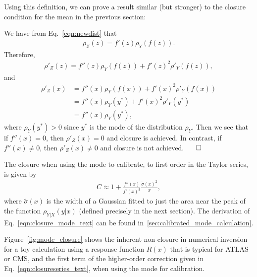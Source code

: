 \noindent Using this definition, we can prove a result similar (but stronger) to the closure condition for the mean in the previous section:

\vspace{5mm}


\vspace{5mm}

 We have from Eq.~\ref{eqn:newdist} that
\begin{align}
\rho_Z(z) = f'(z)\rho_Y(f(z)).
\end{align}
Therefore,
\begin{align}
\rho'_Z(z) = f''(z)\rho_Y(f(z))+f'(z)^2\rho'_Y(f(z)),
\end{align}
and
\begin{align}
\rho'_Z(x) &= f''(x)\rho_Y(f(x))+f'(x)^2\rho'_Y(f(x))\nonumber\\
&=f''(x)\rho_Y(y^*)+f'(x)^2\rho'_Y(y^*)\nonumber\\
&=f''(x)\rho_Y(y^*),
\end{align}
where $\rho_Y(y^*)>0$ since $y^*$ is the mode of the distribution $\rho_Y$. Then we see that if $f''(x)=0$, then $\rho'_Z(x)=0$ and closure is achieved.  In contrast, if $f''(x)\ne 0$, then $\rho'_Z(x)\ne 0$ and closure is not achieved. $\hspace{0.5 cm}\Box$

\vspace{5mm}

\noindent The closure when using the mode to calibrate, to first order in the Taylor series, is given by
\begin{align}
C \approx 1+\frac{f''(x)}{f'(x)^3}\frac{\tilde{\sigma}(x)^2}{x},
\label{eqn:closure_mode_text}
\end{align}
where $\tilde{\sigma}(x)$ is the width of a Gaussian fitted to just the area near the peak of the function $\rho_{Y|X}(y|x)$ (defined precisely in the next section). The derivation of Eq.~\ref{eqn:closure_mode_text} can be found in~\ref{sec:calibrated_mode_calculation}.

Figure~\ref{fig:mode_closure} shows the inherent non-closure in numerical inversion for a toy calculation using a response function $R(x)$ that is typical for ATLAS or CMS, and the first term of the higher-order correction given in Eq.~\ref{eqn:closureseries_text}, when using the mode for calibration.

